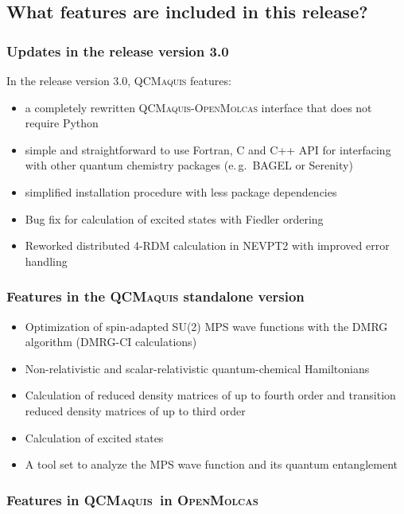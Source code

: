 \documentclass[bibliography=totoc,12pt,a4paper]{scrartcl}
\newcommand{\relv}{release version 3.0}
\newcommand{\mol}{\textsc{OpenMolcas}}
\newcommand{\qcm}{\textsc{QCMaquis}}
\begin{document}
\subsection{What features are included in this release?}
\label{sec:features-v1.0}

\subsubsection{Updates in the \relv}
In the \relv, \qcm{} features:
\begin{itemize}
  \item a completely rewritten \qcm{}-\mol{} interface that does not require Python
  \item simple and straightforward to use Fortran, C and C++ API for interfacing with other quantum chemistry packages (e.\,g.\ BAGEL or Serenity)
  \item simplified installation procedure with less package dependencies
  \item Bug fix for calculation of excited states with Fiedler ordering
  \item Reworked distributed 4-RDM calculation in NEVPT2 with improved error handling
\end{itemize}

\subsubsection{Features in the \qcm{} standalone version}\label{sec:features-stand}

\begin{itemize}
	\item Optimization of spin-adapted SU(2) MPS wave functions with the DMRG algorithm (DMRG-CI calculations)
	\item Non-relativistic and scalar-relativistic quantum-chemical Hamiltonians
	\item Calculation of reduced density matrices of up to fourth order and transition reduced density matrices of up to third order
	\item Calculation of excited states
	\item A tool set to analyze the MPS wave function and its quantum entanglement
\end{itemize}

\subsubsection{Features in  \qcm\ in \mol}\label{sec:features-qcm-mol}
\end{document}
